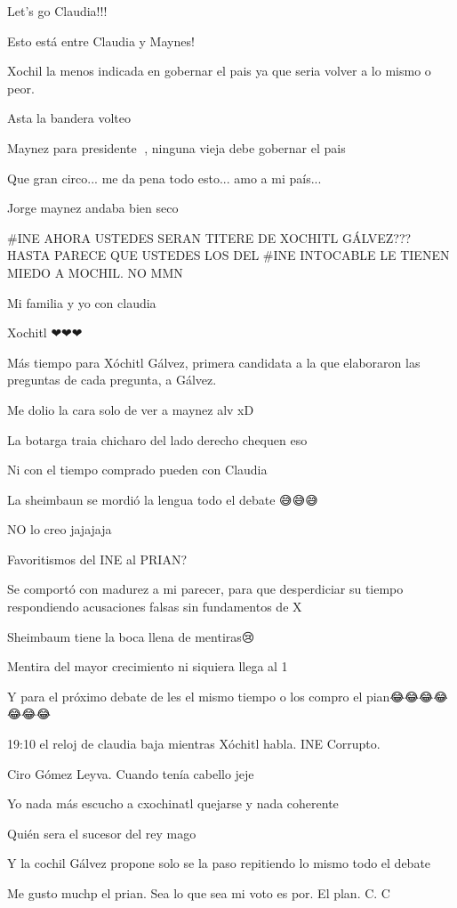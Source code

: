 Let’s go Claudia!!!

Esto está entre Claudia y Maynes!

Xochil la menos indicada en gobernar el pais ya que seria volver a lo mismo o peor.

Asta la bandera volteo

Maynez para presidente 🗿, ninguna vieja debe gobernar el pais

Que gran circo... me da pena todo esto... amo a mi país...

Jorge maynez andaba bien seco

#INE AHORA USTEDES SERAN TITERE DE XOCHITL GÁLVEZ??? HASTA PARECE QUE USTEDES LOS DEL #INE INTOCABLE LE TIENEN MIEDO A MOCHIL. NO MMN🤦🏻‍♀️🤦🏻‍♀️

Mi familia y yo con claudia

Xochitl ❤❤❤

Más tiempo para Xóchitl Gálvez, primera candidata a la que elaboraron las preguntas de cada pregunta, a Gálvez.

Me dolio la cara solo de ver a maynez alv xD

La botarga traia chicharo del lado derecho chequen eso

Ni con el tiempo comprado pueden con Claudia

La sheimbaun se mordió la lengua todo el debate 😅😅😅

NO lo creo jajajaja

Favoritismos del INE al PRIAN?

Se comportó con madurez a mi parecer, para que desperdiciar su tiempo respondiendo acusaciones falsas sin fundamentos de X🤨

Sheimbaum tiene la boca llena de mentiras😢

Mentira del mayor crecimiento ni siquiera llega al 1%

Y para el próximo debate de les el mismo tiempo o los compro el pian😂😂😂😂😂😂😂🐀🐀🐀🐀🐀🐀🐀

19:10 el reloj de claudia baja mientras Xóchitl habla. INE Corrupto.

Ciro Gómez Leyva.
Cuando tenía cabello jeje

Yo nada más escucho a cxochinatl quejarse y nada coherente

Quién sera el sucesor del rey mago

Y la cochil Gálvez  propone solo se la paso repitiendo lo mismo todo el debate

Me gusto muchp el prian. Sea lo que sea mi voto es por. El plan. C. C

